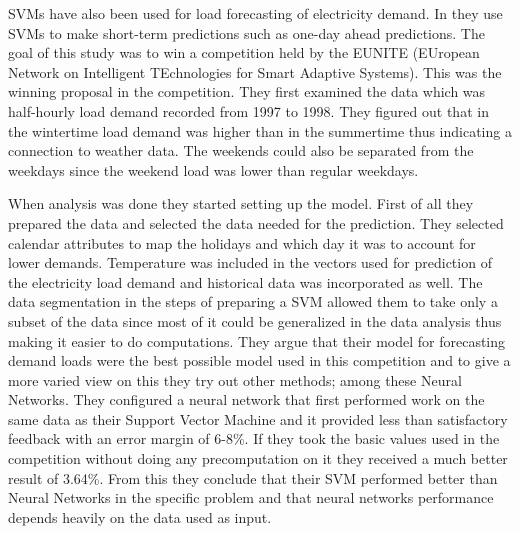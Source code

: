 SVMs have also been used for load forecasting of electricity demand. In \cite{chen2004load} they use SVMs to make short-term predictions such as one-day ahead predictions. The goal of this study was to win a competition held by the EUNITE (EUropean Network on Intelligent TEchnologies for Smart Adaptive Systems). This was the winning proposal in the competition. They first examined the data which was half-hourly load demand recorded from 1997 to 1998. They figured out that in the wintertime load demand was higher than in the summertime thus indicating a connection to weather data. The weekends could also be separated from the weekdays since the weekend load was lower than regular weekdays.

When analysis was done they started setting up the model. First of all they prepared the data and selected the data needed for the prediction. They selected calendar attributes to map the holidays and which day it was to account for lower demands. Temperature was included in the vectors used for prediction of the electricity load demand and historical data was incorporated as well. The data segmentation in the steps of preparing a SVM allowed them to take only a subset of the data since most of it could be generalized in the data analysis thus making it easier to do computations. They argue that their model for forecasting demand loads were the best possible model used in this competition and to give a more varied view on this they try out other methods; among these Neural Networks. They configured a neural network that first performed work on the same data as their Support Vector Machine and it provided less than satisfactory feedback with an error margin of 6-8\%. If they took the basic values used in the competition without doing any precomputation on it they received a much better result of 3.64\%. From this they conclude that their SVM performed better than Neural Networks in the specific problem and that neural networks performance depends heavily on the data used as input. 